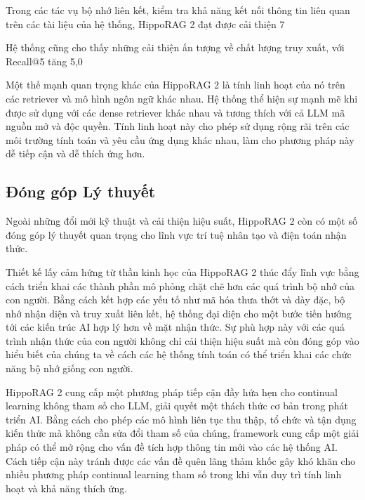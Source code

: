 \documentclass[../main.tex]{subfiles}
\begin{document}
Trong các tác vụ bộ nhớ liên kết, kiểm tra khả năng kết nối thông tin liên quan trên các tài liệu của hệ thống, HippoRAG 2 đạt được cải thiện 7%

Hệ thống cũng cho thấy những cải thiện ấn tượng về chất lượng truy xuất, với Recall@5 tăng 5,0%

Một thế mạnh quan trọng khác của HippoRAG 2 là tính linh hoạt của nó trên các retriever và mô hình ngôn ngữ khác nhau. Hệ thống thể hiện sự mạnh mẽ khi được sử dụng với các dense retriever khác nhau và tương thích với cả LLM mã nguồn mở và độc quyền. Tính linh hoạt này cho phép sử dụng rộng rãi trên các môi trường tính toán và yêu cầu ứng dụng khác nhau, làm cho phương pháp này dễ tiếp cận và dễ thích ứng hơn.

\subsection{Đóng góp Lý thuyết}
Ngoài những đổi mới kỹ thuật và cải thiện hiệu suất, HippoRAG 2 còn có một số đóng góp lý thuyết quan trọng cho lĩnh vực trí tuệ nhân tạo và điện toán nhận thức.

Thiết kế lấy cảm hứng từ thần kinh học của HippoRAG 2 thúc đẩy lĩnh vực bằng cách triển khai các thành phần mô phỏng chặt chẽ hơn các quá trình bộ nhớ của con người. Bằng cách kết hợp các yếu tố như mã hóa thưa thớt và dày đặc, bộ nhớ nhận diện và truy xuất liên kết, hệ thống đại diện cho một bước tiến hướng tới các kiến trúc AI hợp lý hơn về mặt nhận thức. Sự phù hợp này với các quá trình nhận thức của con người không chỉ cải thiện hiệu suất mà còn đóng góp vào hiểu biết của chúng ta về cách các hệ thống tính toán có thể triển khai các chức năng bộ nhớ giống con người.

HippoRAG 2 cung cấp một phương pháp tiếp cận đầy hứa hẹn cho continual learning không tham số cho LLM, giải quyết một thách thức cơ bản trong phát triển AI. Bằng cách cho phép các mô hình liên tục thu thập, tổ chức và tận dụng kiến thức mà không cần sửa đổi tham số của chúng, framework cung cấp một giải pháp có thể mở rộng cho vấn đề tích hợp thông tin mới vào các hệ thống AI. Cách tiếp cận này tránh được các vấn đề quên lãng thảm khốc gây khó khăn cho nhiều phương pháp continual learning tham số trong khi vẫn duy trì tính linh hoạt và khả năng thích ứng.
\end{document}
